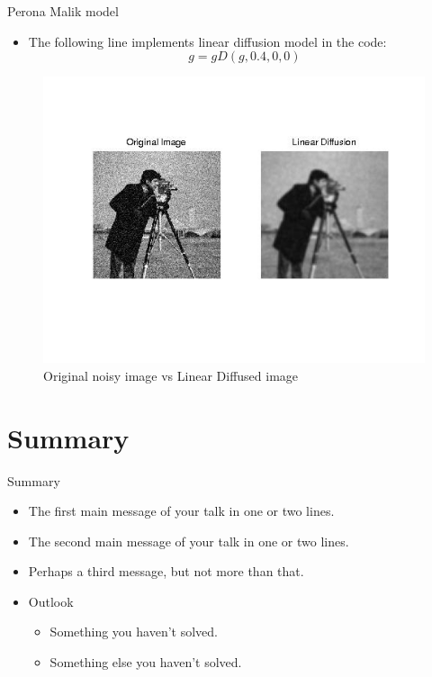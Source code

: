 \documentclass{beamer}
\begin{document}
\begin{frame}{Perona Malik model}
    \begin{itemize}
    \item {The following line implements linear diffusion model in the code: \[g=gD(g,0.4,0,0)\]}
    \end{itemize}
\begin{figure}
\caption{Original noisy image vs Linear Diffused image}
\includegraphics[scale=0.5]{ld.jpg}
\end{figure}
\end{frame}

\section*{Summary}

\begin{frame}{Summary}
  \begin{itemize}
  \item
    The \alert{first main message} of your talk in one or two lines.
  \item
    The \alert{second main message} of your talk in one or two lines.
  \item
    Perhaps a \alert{third message}, but not more than that.
  \end{itemize}
  
  \begin{itemize}
  \item
    Outlook
    \begin{itemize}
    \item
      Something you haven't solved.
    \item
      Something else you haven't solved.
    \end{itemize}
  \end{itemize}
\end{frame}
\end{document}
